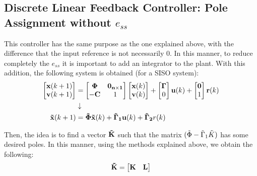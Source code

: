 \subsection{Discrete Linear Feedback Controller: Pole Assignment without $e_{ss}$}\label{sec:state_feed_noess}
This controller has the same purpose as the one explained above, with the difference that the input reference is not necessarily 0. In this manner, to reduce completely the $e_{ss}$ it is important to add an integrator to the plant. With this addition, the following system is obtained (for a SISO system):
\begin{align}
    \begin{bmatrix}
        \mathbf{x}(k+1) \\
        \mathbf{v}(k+1)
    \end{bmatrix}
    &= 
    \begin{bmatrix}
        \mathbf{\Phi} & \mathbf{0_{n \times 1}} \\
        \mathbf{-C} & 1
    \end{bmatrix}
    \begin{bmatrix}
        \mathbf{x}(k) \\
        \mathbf{v}(k)
    \end{bmatrix}
    +
    \begin{bmatrix}
        \mathbf{\Gamma} \\
        0
    \end{bmatrix}\mathbf{u}(k)
    +
    \begin{bmatrix}
        \mathbf{0} \\
        1
    \end{bmatrix}\mathbf{r}(k) \nonumber \\
    & \downarrow \nonumber \\
    \mathbf{\Tilde{x}}(k+1) &= \mathbf{\Tilde{\Phi}}\mathbf{\Tilde{x}}(k) + \mathbf{\Tilde{\Gamma}_1}\mathbf{u}(k) + \mathbf{\Tilde{\Gamma}_2}r(k)
\end{align}

Then, the idea is to find a vector $\mathbf{\Tilde{K}}$ such that the matrix $(\Tilde{\Phi} - \Tilde{\Gamma}_1\Tilde{K})$ has some desired poles. In this manner, using the methods explained above, we obtain the following:
\begin{equation}
    \mathbf{\Tilde{K}} = 
    \begin{bmatrix}
        \mathbf{K} & \mathbf{L}
    \end{bmatrix}
\end{equation}

